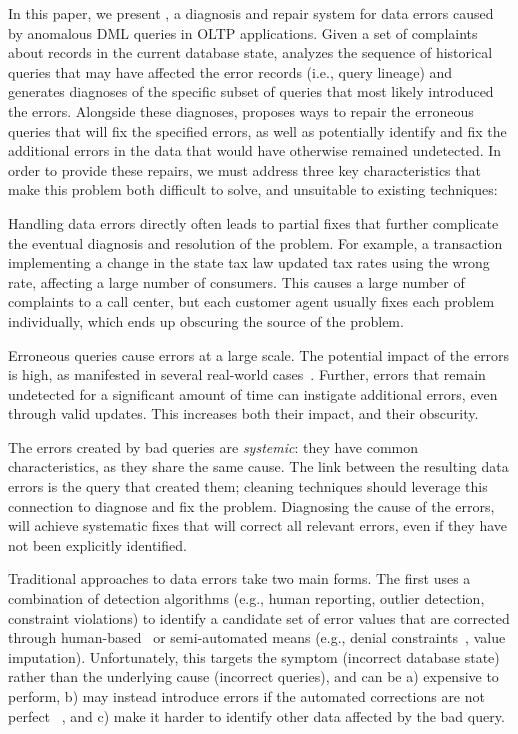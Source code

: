 In this paper, we present \sys, a diagnosis and repair system for data errors caused by anomalous DML queries in OLTP applications.  Given a set of complaints about records in the current database state, \sys analyzes the sequence of historical queries that may have affected the error records (i.e., query lineage) and generates diagnoses of the specific subset of queries that most likely introduced the errors.  Alongside these diagnoses, \sys proposes ways to repair the erroneous queries that will fix the specified errors, as well as potentially identify and fix the additional errors in the data that would have otherwise remained undetected.  In order to provide these repairs, we must address three key characteristics that make this problem both difficult to solve, and unsuitable to existing techniques:
\begin{description}[leftmargin=*, topsep=0mm, itemsep=0mm]
\item[Obscurity.] Handling data errors directly often leads to partial fixes that further complicate the eventual diagnosis and resolution of the problem. For example, a transaction implementing a change in the state tax law updated tax rates using the wrong rate, affecting a large number of consumers. This causes a large number of complaints to a call center, but each customer agent usually fixes each problem individually, which ends up obscuring the source of the problem.

\item[Large impact.] Erroneous queries cause errors at a large scale. The potential impact of the errors is high, as manifested in several real-world cases~\cite{Yates10, Grady13, sakalerrors}. Further, errors that remain undetected for a significant amount of time can instigate additional errors, even through valid updates. This increases both their impact, and their obscurity.

\item[Systemic errors.] The errors created by bad queries are \emph{systemic}: they have common characteristics, as they share the same cause. The link between the resulting data errors is the query that created them; cleaning techniques should leverage this connection to diagnose and fix the problem. Diagnosing the cause of the errors, will achieve systematic fixes that will correct all relevant errors, even if they have not been explicitly identified.
\end{description}

Traditional approaches to data errors take two main forms.  The first uses a combination of detection algorithms (e.g., human reporting, outlier detection, constraint violations) to identify a candidate set of error values that are corrected through human-based~\cite{haasclamshell,Gokhale:2014wv,Kandel:2011vj} or semi-automated means (e.g., denial constraints~\cite{ChuIP13}, value imputation).   Unfortunately, this  targets the symptom (incorrect database state) rather than the underlying cause (incorrect queries), and can be a) expensive to perform, b) may instead introduce errors if the automated corrections are not perfect~\cite{paolo study} , and c) make it harder to identify other data affected by the bad query.

